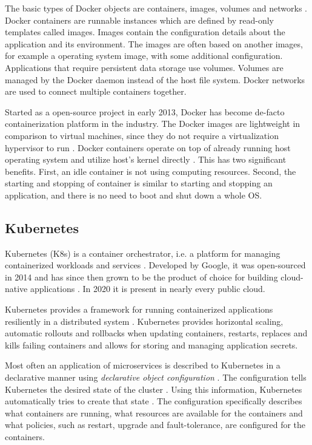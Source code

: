 \documentclass[article]{aaltoseries}
\begin{document}
The basic types of Docker objects are containers, images, volumes and networks \cite{docker}. Docker containers are runnable instances which are defined by read-only templates called images. Images contain the configuration details about the application and its environment. The images are often based on another images, for example a operating system image, with some additional configuration. Applications that require persistent data storage use volumes. Volumes are managed by the Docker daemon instead of the host file system. Docker networks are used to connect multiple containers together.

Started as a open-source project in early 2013, Docker has become de-facto containerization platform in the industry. The Docker images are lightweight in comparison to virtual machines, since they do not require a virtualization hypervisor to run \cite{docker}. Docker containers operate on top of already running host operating system and utilize host's kernel directly \cite{merkel2014docker}. This has two significant benefits. First, an idle container is not using computing resources. Second, the starting and stopping of container is similar to starting and stopping an application, and there is no need to boot and shut down a whole OS.

\subsection{Kubernetes}

Kubernetes (K8s) is a container orchestrator, i.e. a platform for managing containerized workloads and services \cite{k8s}. Developed by Google, it was open-sourced in 2014 and has since then
grown to be the product of choice for building cloud-native applications \cite{hightower2017kubernetes}. In 2020 it is present in nearly every public cloud.

Kubernetes provides a framework for running containerized applications resiliently in a distributed system \cite{k8s}. Kubernetes provides horizontal scaling, automatic rollouts and rollbacks when updating containers, restarts, replaces and kills failing containers and allows for storing and managing application secrets.

Most often an application of microservices is described to Kubernetes in a declarative manner using \textit{declarative object configuration} \cite{k8s-obj-man}. The configuration tells Kubernetes the desired state of the cluster \cite{hightower2017kubernetes}. Using this information, Kubernetes automatically tries to create that state \cite{k8s-objects}. The configuration specifically describes what containers are running, what resources are available for the containers and what policies, such as restart, upgrade and fault-tolerance, are configured for the containers.
\end{document}
